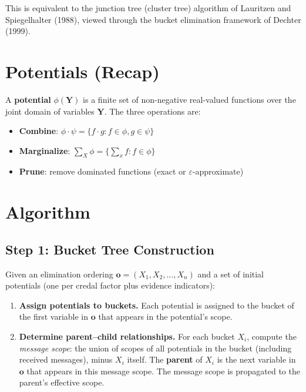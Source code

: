 \documentclass[11pt]{article}
\begin{document}
This is equivalent to the junction tree (cluster tree) algorithm of
Lauritzen and Spiegelhalter (1988), viewed through the bucket elimination framework
of Dechter (1999).

\section{Potentials (Recap)}

A \textbf{potential} $\phi(\mathbf{Y})$ is a finite set of non-negative real-valued
functions over the joint domain of variables $\mathbf{Y}$. The three operations are:
\begin{itemize}
  \item \textbf{Combine}: $\phi \cdot \psi = \{f \cdot g : f \in \phi, g \in \psi\}$
  \item \textbf{Marginalize}: $\sum_X \phi = \{\sum_x f : f \in \phi\}$
  \item \textbf{Prune}: remove dominated functions (exact or $\varepsilon$-approximate)
\end{itemize}

\section{Algorithm}

\subsection{Step 1: Bucket Tree Construction}

Given an elimination ordering $\mathbf{o} = (X_1, X_2, \dots, X_n)$ and a set of
initial potentials (one per credal factor plus evidence indicators):

\begin{enumerate}
  \item \textbf{Assign potentials to buckets.} Each potential is assigned to the
        bucket of the first variable in $\mathbf{o}$ that appears in the potential's
        scope.
  \item \textbf{Determine parent--child relationships.} For each bucket $X_i$,
        compute the \emph{message scope}: the union of scopes of all potentials in
        the bucket (including received messages), minus $X_i$ itself. The
        \textbf{parent} of $X_i$ is the next variable in $\mathbf{o}$ that appears
        in this message scope. The message scope is propagated to the parent's
        effective scope.
\end{enumerate}
\end{document}
